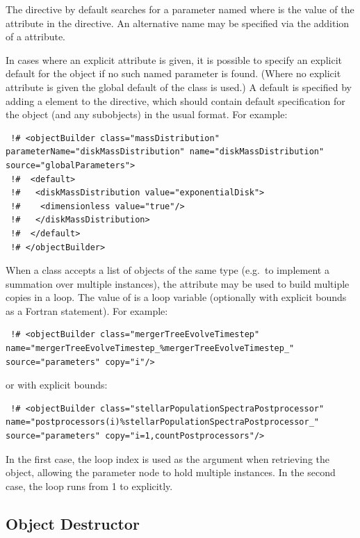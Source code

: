 The  directive by default searches for a parameter named  where  is the value of the  attribute in the directive. An alternative name may be specified via the addition of a  attribute.

In cases where an explicit  attribute is given, it is possible to specify an explicit default for the object if no such named parameter is found. (Where no explicit  attribute is given the global default of the class is used.) A default is specified by adding a  element to the directive, which should contain default specification for the object (and any subobjects) in the usual format. For example:
\begin{verbatim}
 !# <objectBuilder class="massDistribution" parameterName="diskMassDistribution" name="diskMassDistribution" source="globalParameters">
 !#  <default>
 !#   <diskMassDistribution value="exponentialDisk">
 !#    <dimensionless value="true"/>
 !#   </diskMassDistribution>
 !#  </default>
 !# </objectBuilder>
\end{verbatim}

When a class accepts a list of objects of the same type (e.g.\ to implement a summation over multiple instances), the  attribute may be used to build multiple copies in a loop. The value of  is a loop variable (optionally with explicit bounds as a Fortran  statement). For example:
\begin{verbatim}
 !# <objectBuilder class="mergerTreeEvolveTimestep" name="mergerTreeEvolveTimestep_%mergerTreeEvolveTimestep_" source="parameters" copy="i"/>
\end{verbatim}
or with explicit bounds:
\begin{verbatim}
 !# <objectBuilder class="stellarPopulationSpectraPostprocessor" name="postprocessors(i)%stellarPopulationSpectraPostprocessor_" source="parameters" copy="i=1,countPostprocessors"/>
\end{verbatim}
In the first case, the loop index  is used as the  argument when retrieving the object, allowing the parameter node to hold multiple instances. In the second case, the loop runs from 1 to  explicitly.

\subsection{Object Destructor}


